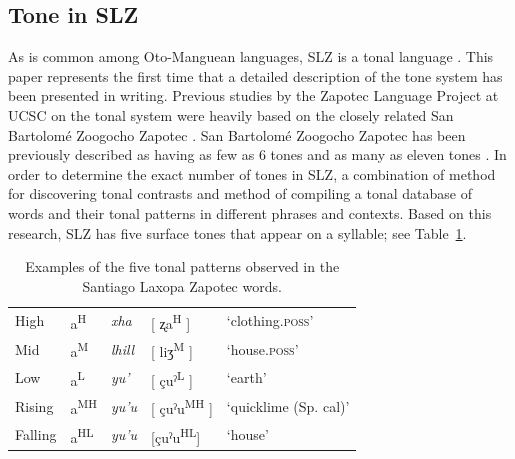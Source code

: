 \documentclass[12pt, letterpaper]{article}
\newcommand{\supr}[1]{\textsuperscript{#1}}
\providecommand{\lsptoprule}{\midrule\toprule}
\providecommand{\lspbottomrule}{\bottomrule\midrule}
\begin{document}
\subsection{Tone in SLZ} \label{sec:Tone}

As is common among Oto-Manguean languages, SLZ is a tonal language \citep{suarezMesoamericanIndianLanguages1983,campbellMesoAmericaLinguisticArea1986,silvermanLaryngealComplexityOtomanguean1997,campbellOtomangueanHistoricalLinguistics2017a,campbellOtomangueanHistoricalLinguistics2017}. 
This paper represents the first time that a detailed description of the tone system has been presented in writing. Previous studies by the Zapotec Language Project at UCSC on the tonal system were heavily based on the closely related San Bartolomé Zoogocho Zapotec \citep{longDiccionarioZapotecoSan2005,sonnenscheinDescriptiveGrammarSan2005}. 
San Bartolomé Zoogocho Zapotec has been previously described as having as few as 6 tones \citep{sonnenscheinDescriptiveGrammarSan2005} and as many as eleven tones \citep{longDiccionarioZapotecoSan2005}. 
In order to determine the exact number of tones in SLZ, a combination of  method for discovering tonal contrasts and  method of compiling a tonal database of words and their tonal patterns in different phrases and contexts. Based on this research, SLZ has five surface tones that appear on a syllable; see Table~\ref{tab:tones}. 

\begin{table}[!h]
	\centering
	\caption{Examples of the five tonal patterns observed in the Santiago Laxopa Zapotec words.}
	\label{tab:tones}
	 \begin{tabular}{lllll}
	  \lsptoprule
	  High   	&  a\supr{H}  &  \textit{xha}   &  [ ʐa\supr{H} ] & `clothing.\textsc{poss}'\\
		Mid    	&  a\supr{M}  &  \textit{lhill} 	& [ liʒ\supr{M} ] & `house.\textsc{poss}' \\
		Low   	&  a\supr{L}  &  \textit{yu'} 	&	 [ çuˀ\supr{L} ] & `earth'\\
		Rising	&  a\supr{MH}  &  \textit{yu'u} 	&	[ çuˀu\supr{MH} ] & `quicklime (Sp. cal)' \\
		Falling &  a\supr{HL}  &  \textit{yu'u}  &	[çuˀu\supr{HL}] &	`house' \\
	  \lspbottomrule
	 \end{tabular}
\end{table}
\end{document}
